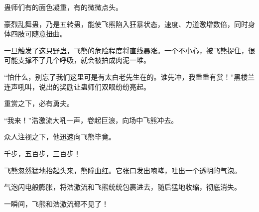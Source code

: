 \begin{this_body}
蛊师们有的面色凝重，有的微微点头。

豪烈乱舞蛊，乃是五转蛊，能使飞熊陷入狂暴状态，速度、力道激增数倍，同时身体四肢可随意扭曲。

一旦触发了这只野蛊，飞熊的危险程度将直线暴涨。一个不小心，被飞熊捉住，很可能支撑不了几个呼吸，就会被拍成肉泥一堆。

“怕什么，别忘了我们这里可是有太白老先生在的。谁先冲，我重重有赏！”黑楼兰连声吼叫，说出的奖励让蛊师们双眼纷纷亮起。

重赏之下，必有勇夫。

“我来！”浩激流大吼一声，卷起巨浪，向场中飞熊冲去。

众人注视之下，他迅速向飞熊毕竟。

千步，五百步，三百步！

飞熊忽然猛地抬起头来，熊瞳血红。它张口发出咆哮，吐出一个透明的气泡。

气泡闪电般膨胀，将浩激流和飞熊统统包裹进去，随后猛地收缩，彻底消失。

一瞬间，飞熊和浩激流都不见了！

\end{this_body}

